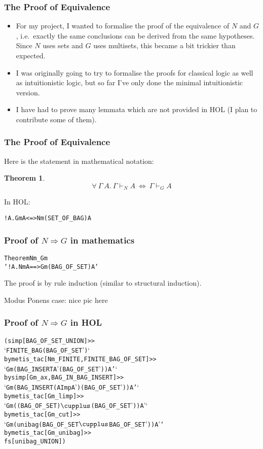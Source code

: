 \documentclass[english,svgnames,hide notes,12pt]{beamer}
\newtheorem{thm}{Theorem}
\theoremstyle{definition}
\theoremstyle{remark}
\begin{document}
\begin{frame}
    \frametitle{The Proof of Equivalence}
    \begin{itemize}
        \item For my project, I wanted to formalise the proof of the equivalence of $N$ and $G$, i.e.\ exactly the same conclusions can be derived from the same hypotheses. Since $N$ uses sets and $G$ uses multisets, this became a bit trickier than expected. 
        \item I was originally going to try to formalise the proofs for classical logic as well as intuitionistic logic, but so far I've only done the minimal intuitionistic version.
        \item I have had to prove many lemmata which are not provided in HOL (I plan to contribute some of them).
    \end{itemize}
\end{frame}

\begin{frame}[fragile]
    \frametitle{The Proof of Equivalence}
    Here is the statement in mathematical notation:
    \begin{thm}
        \[\forall ~\Gamma ~A. ~\Gamma \vdash_N A ~\Leftrightarrow~ \Gamma \vdash_G A\]
    \end{thm}
    In HOL:

    \begin{alltt}
        !\textGamma A. Gm \textGamma A <=> Nm (SET_OF_BAG \textGamma) A
    \end{alltt}
\end{frame}

\begin{frame}[fragile]
    \frametitle{Proof of $N\Rightarrow G$ in mathematics}
\begin{alltt}
Theorem Nm_Gm 
    `!\textGamma A. Nm \textGamma A ==> Gm (BAG_OF_SET \textGamma) A`
\end{alltt}
The proof is by rule induction (similar to structural induction). 

Modus Ponens case:
nice pic here
\[\]

\end{frame}

\begin{frame}[fragile] 
    \frametitle{Proof of $N\Rightarrow G$ in HOL}
    \small
\begin{alltt}
(simp[BAG_OF_SET_UNION] >>
`FINITE_BAG (BAG_OF_SET \textGamma')` 
  by metis_tac[Nm_FINITE,FINITE_BAG_OF_SET] >>
`Gm (BAG_INSERT A' (BAG_OF_SET \textGamma')) A'`
  by simp[Gm_ax,BAG_IN_BAG_INSERT] >>
`Gm (BAG_INSERT (A Imp A') (BAG_OF_SET \textGamma')) A'`
  by metis_tac[Gm_limp] >>
`Gm ((BAG_OF_SET \textGamma) \(\cupplus\) (BAG_OF_SET \textGamma')) A'`
  by metis_tac[Gm_cut] >>
`Gm (unibag (BAG_OF_SET \textGamma \(\cupplus\) BAG_OF_SET \textGamma')) A'` 
  by metis_tac[Gm_unibag] >>
fs[unibag_UNION])
\end{alltt}
\end{frame}
\end{document}
